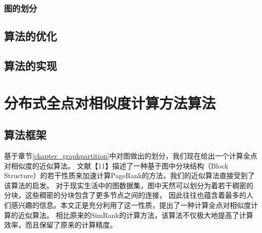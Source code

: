 \documentclass[master]{njuthesis}
\begin{document}
\subsection{图的划分}
\section{算法的优化}

\section{算法的实现}


\chapter{分布式全点对相似度计算方法算法}\label{chapter_allSimRank}
\section{算法框架}
基于章节\ref{chapter_graphpartition}中对图做出的划分，我们现在给出一个计算全点对相似度的近似算法。
文献【11】描述了一种基于图中分块结构（Block Structure）的若干性质来加速计算PageRank的方法，我们的近似算法直接受到了该算法的启发。
对于现实生活中的图数据集，图中天然可以划分为着若干稠密的分块，这些稠密的分块包含了更多节点之间的连接，
因此往往也蕴含着最多的人们感兴趣的信息。本文正是充分利用了这一性质，提出了一种计算全点对相似度计算的近似算法。
相比原来的SimRank的计算方法，该算法不仅极大地提高了计算效率，而且保留了原来的计算精度。
\end{document}

